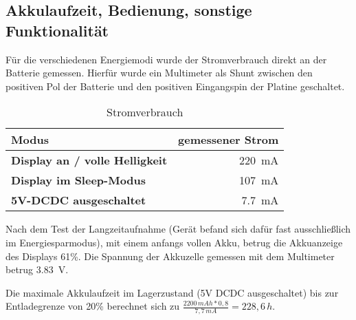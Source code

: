 \subsection{Akkulaufzeit, Bedienung, sonstige Funktionalität}

Für die verschiedenen Energiemodi wurde der Stromverbrauch direkt an der Batterie gemessen. Hierfür wurde ein Multimeter als Shunt zwischen den positiven Pol der Batterie und den positiven Eingangspin der Platine geschaltet.

\begin{table}
\center
\begin{tabular}[]{l|r}
\textbf{Modus} & \textbf{gemessener Strom} 
\\
\hline
\textbf{Display an / volle Helligkeit} & \SI{220}{\milli\ampere} 
\\
\hline
\textbf{Display im Sleep-Modus} & \SI{107}{\milli\ampere} 
\\
\hline
\textbf{5V-DCDC ausgeschaltet} & \SI{7,7}{\milli\ampere}
\end{tabular}

\caption{Stromverbrauch}
\label{tab:Stromverbrauch}

\end{table}

Nach dem Test der Langzeitaufnahme (Gerät befand sich dafür fast ausschließlich im Energiesparmodus), mit einem anfangs vollen Akku, betrug die Akkuanzeige des Displays 61\%. Die Spannung der Akkuzelle gemessen mit dem Multimeter betrug \SI{3,83}{\volt}.

Die maximale Akkulaufzeit im Lagerzustand (5V DCDC ausgeschaltet) bis zur Entladegrenze von 20\% berechnet sich zu
$ \frac{2200\,mAh*0,8}{7,7\,mA} = 228,6\,h $.

